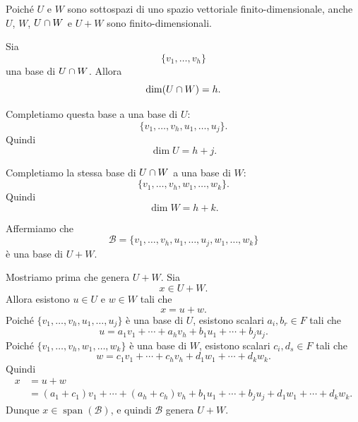 \documentclass[a4paper]{article}
\begin{document}
\begin{snippetproof}{}
    Poiché \(U\) e \(W\) sono sottospazi di uno spazio vettoriale finito-dimensionale, anche \(U\), \(W\), \(U\cap W\) e \(U+W\) sono finito-dimensionali.

    Sia
    \[
        \{v_1,\ldots,v_h\}
    \]
    una base di \(U\cap W\). Allora
    \[
        \dim(U\cap W)=h.
    \]

    Completiamo questa base a una base di \(U\):
    \[
        \{v_1,\ldots,v_h,u_1,\ldots,u_j\}.
    \]
    Quindi
    \[
        \dim U=h+j.
    \]

    Completiamo la stessa base di \(U\cap W\) a una base di \(W\):
    \[
        \{v_1,\ldots,v_h,w_1,\ldots,w_k\}.
    \]
    Quindi
    \[
        \dim W=h+k.
    \]

    Affermiamo che
    \[
        \mathcal{B}
        =
        \{v_1,\ldots,v_h,u_1,\ldots,u_j,w_1,\ldots,w_k\}
    \]
    è una base di \(U+W\).

    Mostriamo prima che genera \(U+W\). Sia
    \[
        x\in U+W.
    \]
    Allora esistono \(u\in U\) e \(w\in W\) tali che
    \[
        x=u+w.
    \]
    Poiché \(\{v_1,\ldots,v_h,u_1,\ldots,u_j\}\) è una base di \(U\), esistono scalari \(a_i,b_r\in F\) tali che
    \[
        u=a_1v_1+\cdots+a_hv_h+b_1u_1+\cdots+b_ju_j.
    \]
    Poiché \(\{v_1,\ldots,v_h,w_1,\ldots,w_k\}\) è una base di \(W\), esistono scalari \(c_i,d_s\in F\) tali che
    \[
        w=c_1v_1+\cdots+c_hv_h+d_1w_1+\cdots+d_kw_k.
    \]
    Quindi
    \begin{align*}
        x
        &=u+w\\
        &=(a_1+c_1)v_1+\cdots+(a_h+c_h)v_h
        +b_1u_1+\cdots+b_ju_j
        +d_1w_1+\cdots+d_kw_k.
    \end{align*}
    Dunque \(x\in\operatorname{span}(\mathcal{B})\), e quindi \(\mathcal{B}\) genera \(U+W\).


\end{snippetproof}
\end{document}
